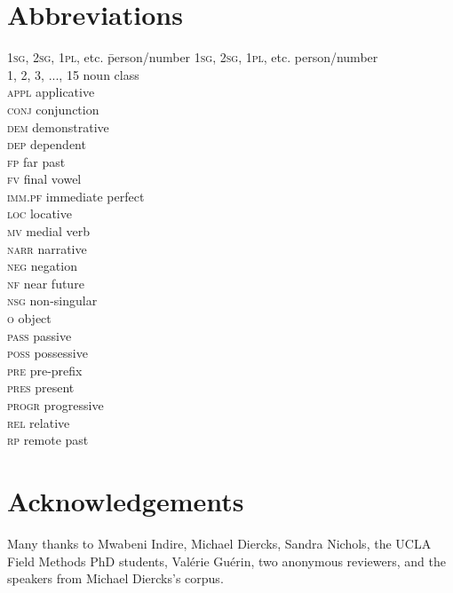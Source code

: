 \documentclass[output=paper]{LSP/langsci}
\begin{document}
\section*{Abbreviations}
\begin{multicols}{2}
\begin{tabbing}
\textsc{1sg, 2sg, 1pl}, etc. \hspace{.5em}  \= person\slash number\kill
\textsc{1sg, 2sg, 1pl}, etc.   \> person\slash number\\
\textsc{1, 2, 3, ..., 15}   \>   noun class\\
\textsc{appl}   \>   applicative\\
\textsc{conj}   \>   conjunction\\
\textsc{dem}    \>  demonstrative\\
\textsc{dep}    \>  dependent\\
\textsc{fp}     \>  far past\\
\textsc{fv}     \>  final vowel\\
\textsc{imm.pf} \>   immediate perfect\\
\textsc{loc}    \>   locative\\
\textsc{mv}     \> medial verb\\
\textsc{narr}   \>  narrative\\
\textsc{neg}    \>   negation\\
\textsc{nf}     \>  near future\\
\textsc{nsg}    \>  non-singular\\
\textsc{o}      \> object\\
\textsc{pass}   \>   passive\\
\textsc{poss}   \>    possessive\\
\textsc{pre}    \>   pre-prefix\\
\textsc{pres}   \>    present\\
\textsc{progr}  \>   progressive\\
\textsc{rel}    \>   relative\\
\textsc{rp}     \>  remote past\\
\end{tabbing}
\end{multicols}


\section*{Acknowledgements}
Many thanks to Mwabeni Indire, Michael Diercks, Sandra Nichols, the UCLA Field Methods PhD students, Valérie Guérin, two anonymous reviewers, and the speakers from Michael Diercks’s corpus. 

\sloppy

\printbibliography[heading=subbibliography,notkeyword=this] 
\end{document}
